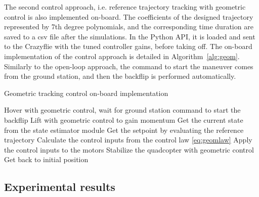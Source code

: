 The second control approach, i.e. reference trajectory tracking with geometric control is also implemented on-board. The coefficients of the designed trajectory represented by 7th degree polynomials, and the corresponding time duration are saved to a csv file after the simulations. In the Python API, it is loaded and sent to the Crazyflie with the tuned controller gains, before taking off. The on-board implementation of the control approach is detailed in Algorithm~\ref{alg:geom}. Similarly to the open-loop approach, the command to start the maneuver comes from the ground station, and then the backflip is performed automatically.
\begin{algorithm}
  \caption{Geometric tracking control on-board implementation}
  \label{alg:geom}
  \begin{algorithmic}[1]
    \State Hover with geometric control, wait for ground station command to start the backflip
    \State Lift with geometric control to gain momentum
      \State Get the current state from the state estimator module
      \State Get the setpoint by evaluating the reference trajectory
      \State Calculate the control inputs from the control law \eqref{eq:geomlaw}
      \State Apply the control inputs to the motors
    \EndWhile
    \State Stabilize the quadcopter with geometric control
    \State Get back to initial position
  \end{algorithmic}
  \end{algorithm}




\subsection{Experimental results}

